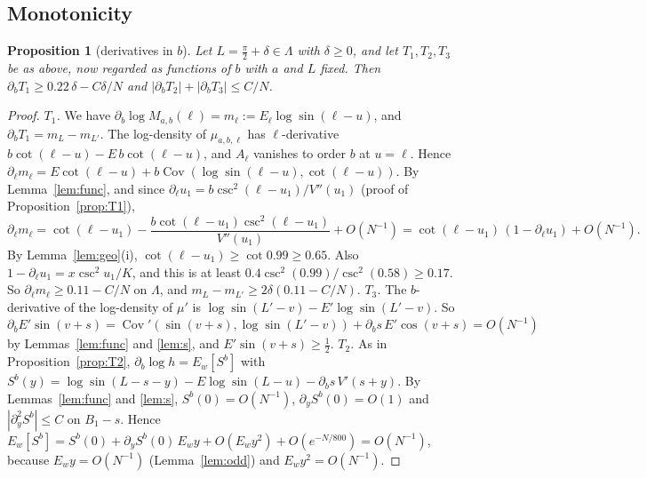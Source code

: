 \documentclass[11pt]{amsart}
\newtheorem{proposition}[theorem]{Proposition}
\theoremstyle{definition}
\begin{document}
\subsection*{Monotonicity}
\begin{proposition}[derivatives in $b$]\label{prop:Tb}
Let $L=\frac\pi2+\delta\in\Lambda$ with $\delta\ge0$, and let $T_1,T_2,T_3$ be as above, now regarded as functions of $b$ with $a$ and $L$ fixed.
Then $\partial_bT_1\ge0.22\,\delta-C\delta/N$ and $|\partial_bT_2|+|\partial_bT_3|\le C/N$.
\end{proposition}
\begin{proof}
\emph{$T_1$.} We have $\partial_b\log M_{a,b}(\ell)=m_\ell:=E_\ell\log\sin(\ell-u)$, and $\partial_bT_1=m_L-m_{L'}$. The log-density of $\mu_{a,b,\ell}$ has
$\ell$-derivative $b\cot(\ell-u)-E\,b\cot(\ell-u)$, and $A_\ell$ vanishes to order $b$ at $u=\ell$. Hence
$\partial_\ell m_\ell=E\cot(\ell-u)+b\operatorname{Cov}(\log\sin(\ell-u),\cot(\ell-u))$. By Lemma~\ref{lem:func}, and since
$\partial_\ell u_1=b\csc^2(\ell-u_1)/V''(u_1)$ (proof of Proposition~\ref{prop:T1}),
\[
\partial_\ell m_\ell=\cot(\ell-u_1)-\frac{b\cot(\ell-u_1)\csc^2(\ell-u_1)}{V''(u_1)}+O(N^{-1})
=\cot(\ell-u_1)\,(1-\partial_\ell u_1)+O(N^{-1}).
\]
By Lemma~\ref{lem:geo}(i), $\cot(\ell-u_1)\ge\cot0.99\ge0.65$. Also $1-\partial_\ell u_1=x\csc^2u_1/K$, and this is at least
$0.4\csc^2(0.99)/\csc^2(0.58)\ge0.17$. So
$\partial_\ell m_\ell\ge0.11-C/N$ on $\Lambda$, and $m_L-m_{L'}\ge2\delta(0.11-C/N)$.
\emph{$T_3$.} The $b$-derivative of the log-density of $\mu'$ is $\log\sin(L'-v)-E'\log\sin(L'-v)$. So
$\partial_bE'\sin(v+s)=\operatorname{Cov}'(\sin(v+s),\log\sin(L'-v))+\partial_bs\,E'\cos(v+s)=O(N^{-1})$ by Lemmas~\ref{lem:func}
and \ref{lem:s}, and $E'\sin(v+s)\ge\frac12$.
\emph{$T_2$.} As in Proposition~\ref{prop:T2}, $\partial_b\log h=E_w[S^b]$ with $S^b(y)=\log\sin(L-s-y)-E\log\sin(L-u)-\partial_bs\,V'(s+y)$.
By Lemmas~\ref{lem:func} and \ref{lem:s}, $S^b(0)=O(N^{-1})$, $\partial_yS^b(0)=O(1)$ and $|\partial_y^2S^b|\le C$ on $B_1-s$. Hence
$E_w[S^b]=S^b(0)+\partial_yS^b(0)\,E_wy+O(E_wy^2)+O(e^{-N/800})=O(N^{-1})$, because $E_wy=O(N^{-1})$ (Lemma~\ref{lem:odd}) and $E_wy^2=O(N^{-1})$.
\end{proof}
\end{document}
